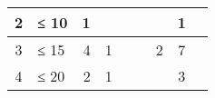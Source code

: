 \begin{table}
\begin{tabular}{
	c
	l
	r r c
	r r c
	r
}
\midrule

2
	& ≤ 10
	& 1 %
	& %
	& %
	& %
	& %
	& 1 %
	\\

\midrule

3
	& ≤ 15
	& 4 %
	& 1 %
	& %
	& %
	& 2 %
	& 7 %
	\\

\midrule

4
	& ≤ 20
	& 2 %
	& 1 %
	& %
	& %
	& %
	& 3 %
	\\








\end{tabular}
\end{table}
